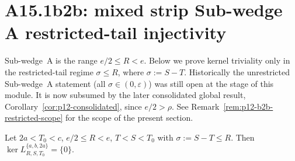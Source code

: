 \section{A15.1b2b: mixed strip Sub-wedge A restricted-tail injectivity}
\label{sec:p12-b2b}

Sub-wedge~A is the range $e/2 \le R < e$.  Below we prove kernel
triviality only in the restricted-tail regime $\sigma \le R$, where
$\sigma := S - T$.  Historically the unrestricted Sub-wedge~A statement
(all $\sigma \in (0, \varepsilon)$) was still open at the stage of this
module.  It is now subsumed by the later consolidated global result,
Corollary~\ref{cor:p12-consolidated}, since $e/2>\rho$.  See
Remark~\ref{rem:p12-b2b-restricted-scope} for the scope of the present
section.

\begin{theorem}\label{thm:p12-b2b}
Let $2a < T_0 < c$, $e/2 \le R < e$, $T < S < T_0$ with
$\sigma := S - T \le R$.  Then
\(\ker L_{R,S,T_0}^{\{a,b,2a\}} = \{0\}\).
\end{theorem}


